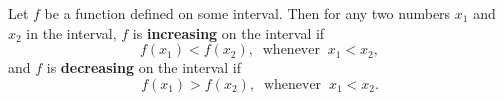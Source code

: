 \documentclass{book}
\begin{document}
\begin{Def} Let $f$ be a function defined on some interval. Then for any two numbers $x_1$ and $x_2$ in the interval, $f$ is \textbf{increasing} on the interval if 
\[f(x_1) < f(x_2),\;\;\mbox{whenever}\;\; x_1< x_2,\] and $f$ is \textbf{decreasing} on the interval if \[f(x_1) > f(x_2),\;\;\mbox{whenever}\;\; x_1< x_2.\]
\end{Def}\vs

%
%

\vfill
{}
\pagebreak
\end{document}
